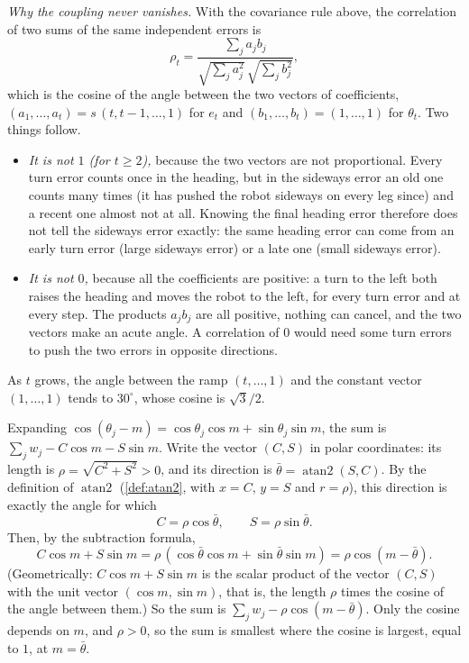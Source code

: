 \emph{Why the coupling never vanishes.} With the covariance rule above,
the correlation of two sums of the same independent errors is
\[
  \rho_t=\frac{\sum_ja_jb_j}{\sqrt{\sum_ja_j^2}\,\sqrt{\sum_jb_j^2}},
\]
which is the cosine of the angle between the two vectors of coefficients,
$(a_1,\dots,a_t)=s\,(t,t-1,\dots,1)$ for $e_t$ and $(b_1,\dots,b_t)=
(1,\dots,1)$ for $\theta_t$. Two things follow.
\begin{itemize}[nosep]
  \item \emph{It is not $1$ (for $t\ge2$),} because the two vectors are
        not proportional. Every turn error counts once in the heading, but
        in the sideways error an old one counts many times (it has pushed
        the robot sideways on every leg since) and a recent one almost not
        at all. Knowing the final heading error therefore does not tell
        the sideways error exactly: the same heading error can come from
        an early turn error (large sideways error) or a late one (small
        sideways error).
  \item \emph{It is not $0$,} because all the coefficients are positive:
        a turn to the left both raises the heading and moves the robot to
        the left, for every turn error and at every step. The products
        $a_jb_j$ are all positive, nothing can cancel, and the two vectors
        make an acute angle. A correlation of $0$ would need some turn
        errors to push the two errors in opposite directions.
\end{itemize}
As $t$ grows, the angle between the ramp $(t,\dots,1)$ and the constant
vector $(1,\dots,1)$ tends to $30^\circ$, whose cosine is
$\sqrt3/2$.

 Expanding $\cos(\theta_j-m)=\cos\theta_j\cos m+
\sin\theta_j\sin m$, the sum is $\sum_jw_j-C\cos m-S\sin m$. Write the
vector $(C,S)$ in polar coordinates: its length is
$\rho=\sqrt{C^2+S^2}>0$, and its direction is
$\bar\theta=\operatorname{atan2}(S,C)$. By the definition of
$\operatorname{atan2}$ (\cref{def:atan2}, with $x=C$, $y=S$ and $r=\rho$),
this direction is exactly the angle for which
\[
  C=\rho\cos\bar\theta,\qquad S=\rho\sin\bar\theta .
\]
Then, by the subtraction formula,
\[
  C\cos m+S\sin m=\rho\,(\cos\bar\theta\cos m+\sin\bar\theta\sin m)
  =\rho\cos(m-\bar\theta).
\]
(Geometrically: $C\cos m+S\sin m$ is the scalar product of the vector
$(C,S)$ with the unit vector $(\cos m,\sin m)$, that is, the length
$\rho$ times the cosine of the angle between them.) So the sum is
$\sum_jw_j-\rho\cos(m-\bar\theta)$. Only the cosine depends on $m$, and
$\rho>0$, so the sum is smallest where the cosine is largest, equal to
$1$, at $m=\bar\theta$.

